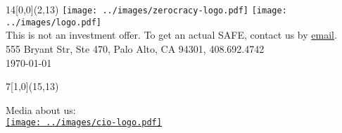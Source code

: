 \documentclass{deck}
\begin{document}
\setlength{\fboxsep}{2pt}
\newcommand\point[2]{\vbox{\raggedright\small%
  \fcolorbox{zgreen}{white}{\color{zgreen}#1}\newline%
  \footnotesize#2\vspace{16pt}}}
\newcommand\highlight[1]{{\color{white}{\hl{\thinspace#1\thinspace}}}}

\begin{textblock}{14}[0,0](2,13){
  \color{gray}\footnotesize
  \texttt{[image: ../images/zerocracy-logo.pdf]}
  \texttt{[image: ../images/logo.pdf]}\\
  This is not an investment offer. To get an actual SAFE,
  contact us by \href{mailto:cio@zerocracy.com}{email}.\\
  555 Bryant Str, Ste 470, Palo Alto, CA 94301, 408.692.4742\\
  \today\quad\zoldversion
}\end{textblock}

\begin{textblock}{7}[1,0](15,13){\begin{flushright}
  \color{gray}\footnotesize
  Media about us:\\
  \href{https://www.cio.com/article/3326560/artificial-intelligence/workplace-ai-emerging-technologies-ethical-questions.html}{\texttt{[image: ../images/cio-logo.pdf]}}
\end{flushright}}\end{textblock}
\end{document}
